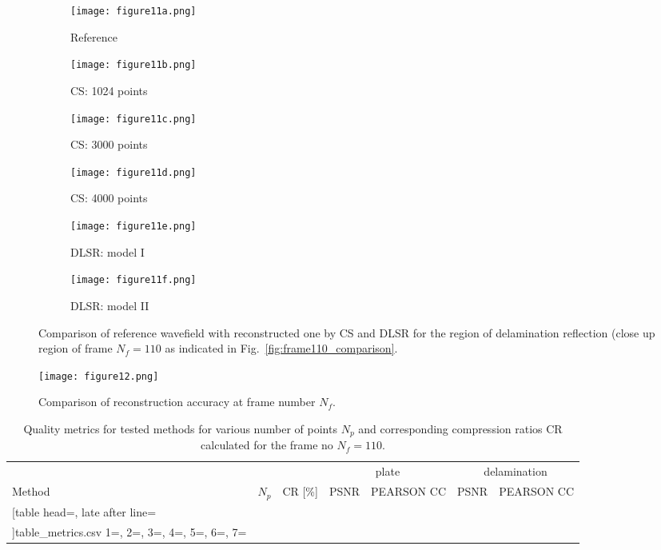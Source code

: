 \begin{figure} [!ht]
	\centering
	\begin{subfigure}[b]{0.32\textwidth}
		\centering
		\texttt{[image: figure11a.png]}
		\caption{Reference}
		\label{fig:frame110delam_ref}
	\end{subfigure}
	\hfill
	\begin{subfigure}[b]{0.32\textwidth}
		\centering
		\texttt{[image: figure11b.png]}
		\caption{CS: 1024 points}
		\label{fig:frame110delam_CS1024}
	\end{subfigure}
	\hfill
	\begin{subfigure}[b]{0.32\textwidth}
		\centering
		\texttt{[image: figure11c.png]}
		\caption{CS: 3000 points}
		\label{fig:frame110delam_CS3000}
	\end{subfigure}	
	\hfill
	\begin{subfigure}[b]{0.32\textwidth}
		\centering
		\texttt{[image: figure11d.png]}
		\caption{CS: 4000 points}
		\label{fig:frame110delam_CS4000}
	\end{subfigure}
	\hfill
	\begin{subfigure}[b]{0.32\textwidth}
		\centering
		\texttt{[image: figure11e.png]}
		\caption{DLSR: model I}
		\label{fig:frame110delam_Abdalraheem}
	\end{subfigure}
	\hfill
	\begin{subfigure}[b]{0.32\textwidth}
		\centering
		\texttt{[image: figure11f.png]}
		\caption{DLSR: model II}
		\label{fig:frame110delam_Saeed}
	\end{subfigure}
	
	\caption{Comparison of reference wavefield with reconstructed one by CS and DLSR for the region of delamination reflection (close up region of frame $N_f = 110$ as indicated in Fig.~\ref{fig:frame110_comparison}.}
	\label{fig:frame110del_comparison}
\end{figure} 
\clearpage
\begin{figure} [!ht]
	\centering
 	\texttt{[image: figure12.png]}
	\caption{Comparison of reconstruction accuracy at frame number $N_f$.}
	\label{fig:frame_metrics}
\end{figure}

\begin{table}[!ht]
	\renewcommand{\arraystretch}{1.3}
	\centering \footnotesize
	\caption{Quality metrics for tested methods for various number of points $N_p$ and corresponding compression ratios CR calculated for the frame no $N_f=110$.}	
	\begin{tabular}{lrrrcrc} 
		\toprule
		& & & \multicolumn{2}{c}{plate} & \multicolumn{2}{c}{delamination} \\
		\cmidrule(lr){4-5} \cmidrule(lr){6-7}
		Method & $N_p$ & CR [\%] & PSNR & PEARSON CC& PSNR & PEARSON CC \\
		\midrule
		\csvreader
		[table head=\toprule,
		late after line=\\ 
		]{table_metrics.csv}{
		1=\one, 2=\two, 3=\three, 4=\four, 5=\five, 6=\six, 7=\seven
		}%
		{\one & \two & \three & \four & \five & \six & \seven }%
		\bottomrule
	\end{tabular}	
	\label{tab:csv_results}
\end{table}